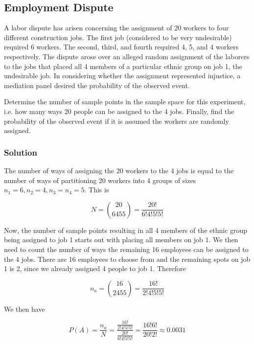 \documentclass[11pt]{article}
\theoremstyle{definition}
\begin{document}
\subsection{Employment Dispute}

A labor dispute has arisen concerning the assignment of 20 workers to four different construction jobs. The first job (considered to be very undesirable) required 6 workers. The second, third, and fourth required 4, 5, and 4 workers respectively. The dispute arose over an alleged random assignment of the laborers to the jobs that placed all 4 members of a particular ethnic group on job 1, the undesirable job. In considering whether the assignment represented injustice, a mediation panel desired the probability of the observed event.

Determine the number of sample points in the sample space for this experiment, i.e. how many ways 20 people can be assigned to the 4 jobs. Finally, find the probability of the observed event if it is assumed the workers are randomly assigned.

\subsubsection*{Solution}

The number of ways of assigning the 20 workers to the 4 jobs is equal to the number of ways of partitioning 20 workers into 4 groups of sizes $n_1 = 6, n_2 = 4, n_ 3 = n_4 = 5$. This is

$$
	N = {20 \choose 6 4 5 5} = \frac{20!}{6!4!5!5!}
$$

Now, the number of sample points resulting in all 4 members of the ethnic group being assigned to job 1 starts out with placing all members on job 1. We then need to count the number of ways the remaining 16 employees can be assigned to the 4 jobs. There are 16 employees to choose from and the remaining spots on job 1 is 2, since we already assigned 4 people to job 1. Therefore

$$
	n_a = {16 \choose 2 4 5 5} = \frac{16!}{2!4!5!5!}
$$

We then have

$$
	P(A) = \frac{n_a}{N} = \frac{\frac{16!}{2!4!5!5!}}{\frac{20!}{6!4!5!5!}} = \frac{16!6!}{20!2!} \approx 0.0031
$$
\end{document}
